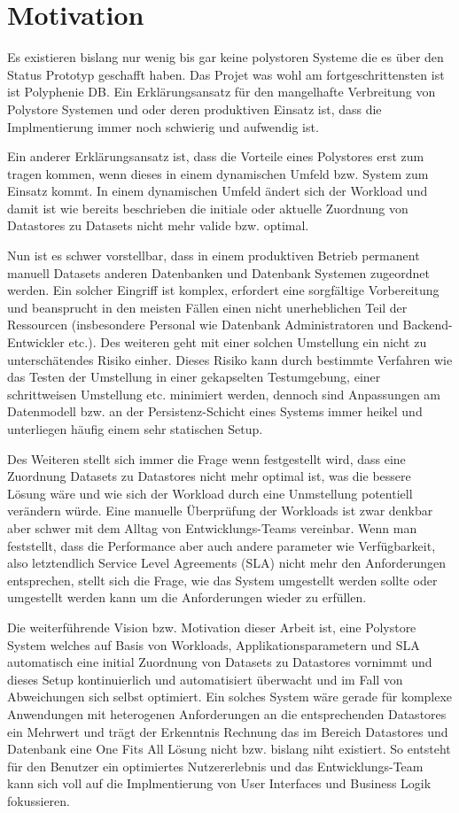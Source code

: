 \section{Motivation}
\label{sec:intro:motivation}
Es existieren bislang nur wenig bis gar keine polystoren Systeme die es über den Status Prototyp
geschafft haben. Das Projet was wohl am fortgeschrittensten ist ist Polyphenie DB.
Ein Erklärungsansatz für den mangelhafte Verbreitung von Polystore Systemen und oder deren 
produktiven Einsatz ist, dass die Implmentierung immer noch schwierig und aufwendig ist.

Ein anderer Erklärungsansatz ist, dass die Vorteile eines Polystores erst zum tragen 
kommen, wenn dieses in einem dynamischen Umfeld bzw. System zum Einsatz kommt. In einem dynamischen
Umfeld ändert sich der Workload und damit ist wie bereits beschrieben die initiale oder 
aktuelle Zuordnung von Datastores zu Datasets nicht mehr valide bzw. optimal.

Nun ist es schwer vorstellbar, dass in einem produktiven Betrieb permanent manuell Datasets
anderen Datenbanken und Datenbank Systemen zugeordnet werden. Ein solcher Eingriff ist komplex,
erfordert eine sorgfältige Vorbereitung und beansprucht in den meisten Fällen einen 
nicht unerheblichen Teil der Ressourcen (insbesondere Personal wie Datenbank Administratoren und 
Backend-Entwickler etc.). Des weiteren geht mit einer solchen Umstellung ein nicht
zu unterschätendes Risiko einher. Dieses Risiko kann durch bestimmte Verfahren wie das Testen 
der Umstellung in einer gekapselten Testumgebung, einer schrittweisen Umstellung etc. minimiert 
werden, dennoch sind Anpassungen am Datenmodell bzw. an der Persistenz-Schicht eines Systems immer heikel
und unterliegen häufig einem sehr statischen Setup.

Des Weiteren stellt sich immer die Frage wenn festgestellt wird, dass eine Zuordnung Datasets zu 
Datastores nicht mehr optimal ist, was die bessere Lösung wäre und wie sich der Workload durch eine 
Unmstellung potentiell verändern würde. Eine manuelle Überprüfung der Workloads ist zwar denkbar aber schwer
mit dem Alltag von Entwicklungs-Teams vereinbar. 
Wenn man feststellt, dass die Performance aber auch andere parameter wie Verfügbarkeit, also letztendlich
Service Level Agreements (SLA) nicht mehr den Anforderungen entsprechen, stellt sich die Frage, wie 
das System umgestellt werden sollte oder umgestellt werden kann um die Anforderungen wieder 
zu erfüllen.

Die weiterführende Vision bzw. Motivation dieser Arbeit ist, eine Polystore System welches auf Basis
von Workloads, Applikationsparametern und SLA automatisch eine initial Zuordnung von Datasets zu Datastores vornimmt
und dieses Setup kontinuierlich und automatisiert überwacht und im Fall von Abweichungen 
sich selbst optimiert. Ein solches System wäre gerade für komplexe Anwendungen mit heterogenen Anforderungen
an die entsprechenden Datastores ein Mehrwert und trägt der Erkenntnis Rechnung 
das im Bereich Datastores und Datenbank eine One Fits All Lösung nicht bzw. bislang niht existiert.
So entsteht für den Benutzer ein optimiertes Nutzererlebnis und das Entwicklungs-Team kann sich voll 
auf die Implmentierung von User Interfaces und Business Logik fokussieren.

